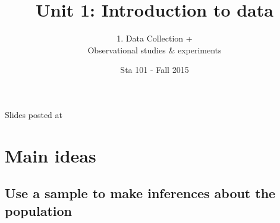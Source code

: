 \documentclass[11pt,containsverbatim,handout,xcolor=xelatex,dvipsnames,table]{beamer}
\title{Unit 1: Introduction to data}
\subtitle{1. Data Collection +\\Observational studies \& experiments}
\author{Sta 101 - Fall 2015}
\author{\CourseName}
\date{}
\institute{\InstituteName}
\begin{document}



\begin{frame}[plain]

\titlepage

\vfill

{\scriptsize {} \hfill Slides posted at  \webURL{\CourseSite}}

\addtocounter{framenumber}{-1} 

\end{frame}


\section{Main ideas}


\subsection{Use a sample to make inferences about the population}
\label{mi1}

\end{document}
